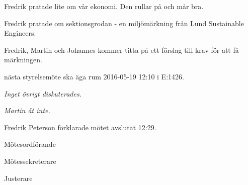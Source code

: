 \documentclass[10pt]{article}
\def\mo{Fredrik Peterson}
\def\ms{Erik Månsson}
\def\ji{Stephanie Mirsky}
\begin{document}
\begin{paragrafer}
\begin{paragrafer}
Fredrik pratade lite om vår ekonomi. Den rullar på och mår bra.

\end{paragrafer}

Fredrik pratade om sektionsgrodan - en miljömärkning från Lund Sustainable Engineers.

Fredrik, Martin och Johannes kommer titta på ett förslag till krav för att få märkningen.

\Mba nästa styrelsemöte ska äga rum 2016-05-19 12:10 i E:1426.


\emph{Inget övrigt diskuterades.}

\emph{Martin åt inte.}

{\mo} förklarade mötet avslutat 12:29.

\end{paragrafer}

\begin{signatures}{3}
\signature{\mo}{Mötesordförande}
\signature{\ms}{Mötessekreterare}
\signature{\ji}{Justerare}
\end{signatures}
\end{document}
